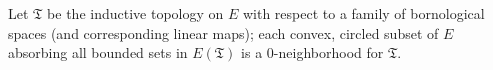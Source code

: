 Let $\mathfrak{T}$ be the inductive topology on $E$ with respect to a family of bornological spaces (and corresponding linear maps); each convex, circled subset of $E$ absorbing all bounded sets in $E(\mathfrak{T})$ is a $0$-neighborhood for $\mathfrak{T}$.

